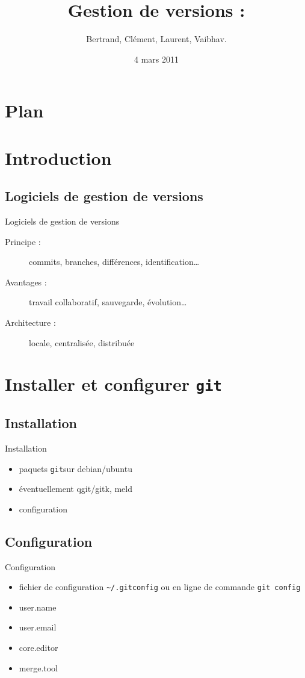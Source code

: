 \documentclass{beamer}
\title[ROSE]{Gestion de versions : \git}
\author{Bertrand, Clément, Laurent, Vaibhav.}
\institute{Télécom ParisTech}
\date{4 mars 2011}
\newcommand{\git}{\texttt{git}}
\begin{document}
\begin{frame}
  \titlepage
\end{frame}

\section*{Plan}

\section{Introduction}

\subsection*{Logiciels de gestion de versions}
\begin{frame}{Logiciels de gestion de versions}
  \begin{description}
  \item[Principe :] commits, branches, différences, identification\dots
  \item[Avantages :] travail collaboratif, sauvegarde, évolution\dots
  \item[Architecture :] locale, centralisée, distribuée
  \end{description}
\end{frame}

\section{Installer et configurer \git}

\subsection*{Installation}
\begin{frame}{Installation}
  \begin{itemize}
  \item paquets \git sur debian/ubuntu
  \item éventuellement qgit/gitk, meld
  \item configuration
  \end{itemize}
\end{frame}

\subsection*{Configuration}
\begin{frame}[containsverbatim]{Configuration}
  \begin{itemize}
  \item fichier de configuration \lstinline|~/.gitconfig| ou en ligne de commande \lstinline|git config|
  \item user.name
  \item user.email
  \item core.editor
  \item merge.tool
  \end{itemize}
\end{frame}
\end{document}
